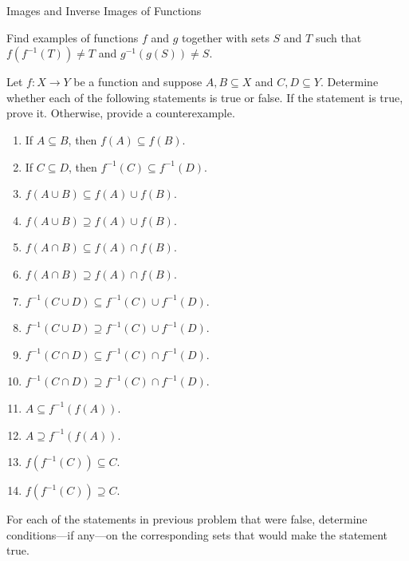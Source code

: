 \begin{section}{Images and Inverse Images of Functions}
\begin{problem}
Find examples of functions $f$ and $g$ together with sets $S$ and $T$ such that $f(f^{-1}(T))\neq T$ and $g^{-1}(g(S))\neq S$.
\end{problem}

\begin{problem}
Let $f:X\to Y$ be a function and suppose $A, B\subseteq X$ and $C, D\subseteq Y$. Determine whether each of the following statements is true or false. If the statement is true, prove it.  Otherwise, provide a counterexample.
\begin{enumerate}[label=\textrm{(\alph*)}]
\item If $A\subseteq B$, then $f(A)\subseteq f(B)$.
\item If $C\subseteq D$, then $f^{-1}(C)\subseteq f^{-1}(D)$.
\item $f(A\cup B)\subseteq f(A)\cup f(B)$.
\item $f(A\cup B)\supseteq f(A)\cup f(B)$.
\item $f(A\cap B)\subseteq f(A)\cap f(B)$.
\item $f(A\cap B)\supseteq f(A)\cap f(B)$.
\item $f^{-1}(C\cup D)\subseteq f^{-1}(C)\cup f^{-1}(D)$.
\item $f^{-1}(C\cup D)\supseteq f^{-1}(C)\cup f^{-1}(D)$.
\item $f^{-1}(C\cap D)\subseteq f^{-1}(C)\cap f^{-1}(D)$.
\item $f^{-1}(C\cap D)\supseteq f^{-1}(C)\cap f^{-1}(D)$.
\item $A\subseteq f^{-1}(f(A))$.
\item $A\supseteq f^{-1}(f(A))$.
\item $f(f^{-1}(C))\subseteq C$.
\item $f(f^{-1}(C))\supseteq C$.
\end{enumerate}
\end{problem}

\begin{problem}
For each of the statements in previous problem that were false, determine conditions---if any---on the corresponding sets that would make the statement true.
\end{problem}

\end{section}